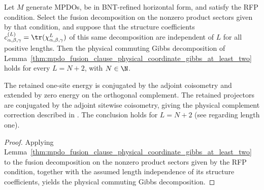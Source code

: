 \begin{lemma}%
    \label{thm:mpdo_physical_coordinate_gibbs_at_least_two}
    \leanok
    Let $M$ generate MPDOs, be in BNT-refined horizontal form,
    and satisfy the RFP condition. Select the fusion decomposition on the
    nonzero product sectors given by that condition, and suppose that the
    structure coefficients $c_{\alpha,\beta,\gamma}^{(L)}
        =\tr(\chi_{\alpha,\beta,\gamma}^{L})$ of this same decomposition are
    independent of $L$ for all positive lengths. Then the physical commuting
    Gibbs decomposition of
    Lemma~\ref{thm:mpdo_fusion_clause_physical_coordinate_gibbs_at_least_two}
    holds for every $L=N+2$, with $N\in\N$.

    The retained one-site energy is conjugated by the adjoint
    coisometry and extended by zero energy on the orthogonal complement.
    The retained projectors are conjugated by the adjoint sitewise
    coisometry, giving the physical complement correction described in
    \cite{gap:cpsv16_topological_gibbs_physical_complement}.
    The conclusion holds for $L=N+2$ (see
    \cite{gap:cpsv16_topological_gibbs_length_one} regarding length one).
\end{lemma}
\begin{proof}\leanok
    Applying
    Lemma~\ref{thm:mpdo_fusion_clause_physical_coordinate_gibbs_at_least_two}
    to the fusion decomposition on the nonzero product sectors given by the
    RFP condition, together with the assumed length independence of its
    structure coefficients, yields the physical commuting Gibbs decomposition.
\end{proof}

